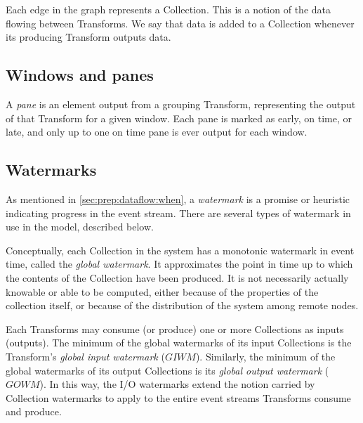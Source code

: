 
Each edge in the graph represents a Collection.
This is a notion of the data flowing between Transforms.
We say that data is added to a Collection whenever its producing Transform outputs data.



\subsection{Windows and panes}



A \emph{pane} is an element output from a grouping Transform, representing the output of that Transform for a given window.
Each pane is marked as early, on time, or late, and only up to one on time pane is ever output for each window.

\subsection{Watermarks}

As mentioned in \cref{sec:prep:dataflow:when}, a \emph{watermark} is a promise or heuristic indicating progress in the event stream.
There are several types of watermark in use in the model, described below.

Conceptually, each Collection in the system has a monotonic watermark in event time, called the \emph{global watermark}.
It approximates the point in time up to which the contents of the Collection have been produced.
It is not necessarily actually knowable or able to be computed, either because of the properties of the collection itself, or because of the distribution of the system among remote nodes.

Each Transforms may consume (or produce) one or more Collections as inputs (outputs).
The minimum of the global watermarks of its input Collections is the Transform's \emph{global input watermark} ($\mathit{GIWM}$).
Similarly, the minimum of the global watermarks of its output Collections is its \emph{global output watermark} ($\mathit{GOWM}$).
In this way, the I/O watermarks extend the notion carried by Collection watermarks to apply to the entire event streams Transforms consume and produce.

